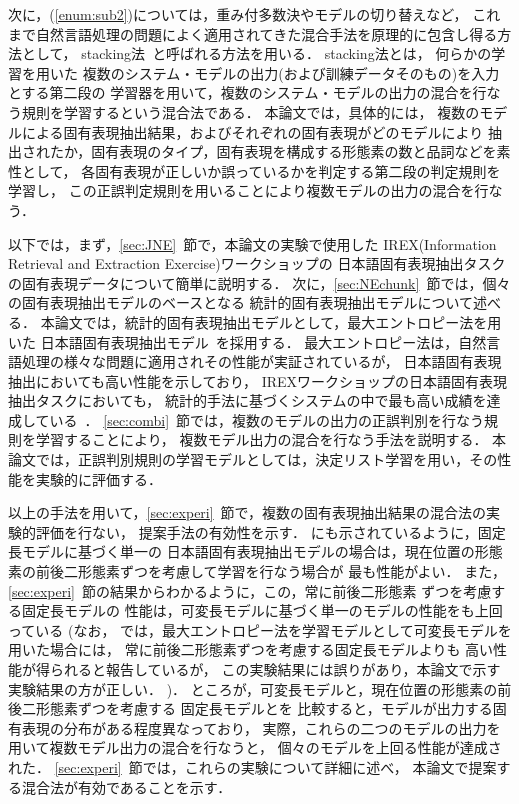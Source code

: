 次に，(\ref{enum:sub2})については，重み付多数決やモデルの切り替えなど，
これまで自然言語処理の問題によく適用されてきた混合手法を原理的に包含し得る方法として，
stacking法~\cite{Wolpert92a}と呼ばれる方法を用いる．
stacking法とは，
何らかの学習を用いた
複数のシステム・モデルの出力(および訓練データそのもの)を入力とする第二段の
学習器を用いて，複数のシステム・モデルの出力の混合を行なう規則を学習するという混合法である．
本論文では，具体的には，
複数のモデルによる固有表現抽出結果，およびそれぞれの固有表現がどのモデルにより
抽出されたか，固有表現のタイプ，固有表現を構成する形態素の数と品詞などを素性として，
各固有表現が正しいか誤っているかを判定する第二段の判定規則を学習し，
この正誤判定規則を用いることにより複数モデルの出力の混合を行なう．

以下では，まず，\ref{sec:JNE}~節で，本論文の実験で使用した
IREX(Information Retrieval and Extraction Exercise)ワークショップ\cite{IREX99aj}の
日本語固有表現抽出タスクの固有表現データについて簡単に説明する．
次に，\ref{sec:NEchunk}~節では，個々の固有表現抽出モデルのベースとなる
統計的固有表現抽出モデルについて述べる．
本論文では，統計的固有表現抽出モデルとして，最大エントロピー法を用いた
日本語固有表現抽出モデル~\cite{Borthwick99aj,Uchimoto00aj}を採用する．
最大エントロピー法は，自然言語処理の様々な問題に適用されその性能が実証されているが，
日本語固有表現抽出においても高い性能を示しており，
IREXワークショップの日本語固有表現抽出タスクにおいても，
統計的手法に基づくシステムの中で最も高い成績を達成している~\cite{Uchimoto00aj}．
\ref{sec:combi}~節では，複数のモデルの出力の正誤判別を行なう規則を学習することにより，
複数モデル出力の混合を行なう手法を説明する．
本論文では，正誤判別規則の学習モデルとしては，決定リスト学習を用い，その性能を実験的に評価する．

以上の手法を用いて，\ref{sec:experi}~節で，複数の固有表現抽出結果の混合法の実験的評価を行ない，
提案手法の有効性を示す．
\cite{Uchimoto00aj}にも示されているように，固定長モデルに基づく単一の
日本語固有表現抽出モデルの場合は，現在位置の形態素の前後二形態素ずつを考慮して学習を行なう場合が
最も性能がよい．
また，\ref{sec:experi}~節の結果からわかるように，この，常に前後二形態素
ずつを考慮する固定長モデルの
性能は，可変長モデルに基づく単一のモデルの性能をも上回っている
(なお，
   \cite{Sassano00bjx}では，最大エントロピー法を学習モデルとして可変長モデルを用いた場合には，  
   常に前後二形態素ずつを考慮する固定長モデルよりも
   高い性能が得られると報告しているが，
   この実験結果には誤りがあり，本論文で示す実験結果の方が正しい．
)．
ところが，可変長モデルと，現在位置の形態素の前後二形態素ずつを考慮する
固定長モデルとを
比較すると，モデルが出力する固有表現の分布がある程度異なっており，
実際，これらの二つのモデルの出力を用いて複数モデル出力の混合を行なうと，
個々のモデルを上回る性能が達成された．
\ref{sec:experi}~節では，これらの実験について詳細に述べ，
本論文で提案する混合法が有効であることを示す．

